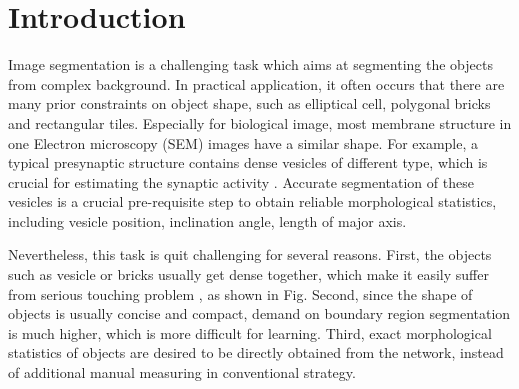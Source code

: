 \documentclass[10pt,twocolumn,letterpaper]{article}
\begin{document}
\section{Introduction}
Image segmentation is a challenging task which aims at segmenting the objects from complex background.
In practical application, it often occurs that there are many prior constraints on object shape, such as elliptical cell, polygonal bricks and rectangular tiles.
Especially for biological image, most membrane structure in one Electron microscopy (SEM) images have a similar shape.
For example, a typical presynaptic structure contains dense vesicles of different type, which is crucial for estimating the synaptic activity \cite{Fernandez-Busnadiego2010}\cite{Fernandez-Busnadiego2013}.
Accurate segmentation of these vesicles is a crucial pre-requisite step to obtain reliable morphological statistics, including vesicle position, inclination angle, length of major axis.

Nevertheless, this task is quit challenging for several reasons.
First, the objects such as vesicle or bricks usually get dense together, which make it easily suffer from serious touching problem \cite{Chen2016}, as shown in Fig.
Second, since the shape of objects is usually concise and compact, demand on boundary region segmentation is much higher, which is more difficult for learning.
Third, exact morphological statistics of objects are desired to be directly obtained from the network, instead of additional manual measuring in conventional strategy.
\end{document}
